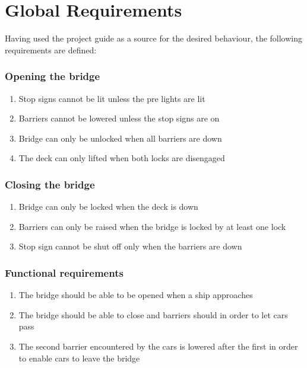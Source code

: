 \section{Global Requirements}
\label{sec:glob}

Having used the project guide as a source for the desired behaviour, the following requirements are defined:

\subsubsection*{Opening the bridge}
\begin{enumerate}
	\item Stop signs cannot be lit unless the pre lights are lit
	\item Barriers cannot be lowered unless the stop signs are on
	\item Bridge can only be unlocked when all barriers are down
	\item The deck can only lifted when both locks are disengaged
	\setcounter{enumTemp}{\theenumi}
\end{enumerate}

\subsubsection*{Closing the bridge}
\begin{enumerate}
	\setcounter{enumi}{\theenumTemp}
	\item Bridge can only be locked when the deck is down
	\item Barriers can only be raised when the bridge is locked by at least one
	      lock
	\item Stop sign cannot be shut off only when the barriers are down
	\setcounter{enumTemp}{\theenumi}
\end{enumerate}

\subsubsection*{Functional requirements}
\begin{enumerate}
	\setcounter{enumi}{\theenumTemp}
	\item The bridge should be able to be opened when a ship approaches
	\item The bridge should be able to close and barriers should in order to
	      let cars pass
	\item The second barrier encountered by the cars is lowered after
	      the first in order to enable cars to leave the bridge
	\setcounter{enumTemp}{\theenumi}
\end{enumerate}

